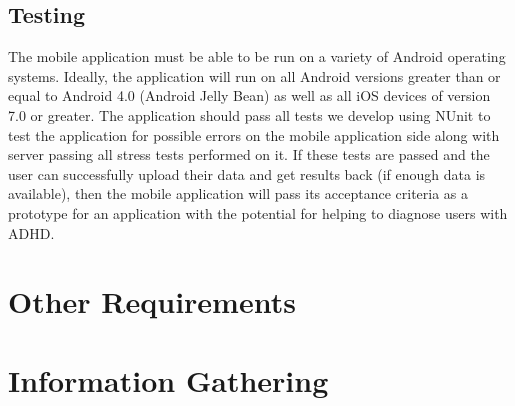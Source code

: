 \documentclass[a4wide]{article}
\begin{document}
\subsection{Testing}
The mobile application must be able to be run on a variety of Android operating
systems. Ideally, the application will run on all Android versions greater than
or equal to Android 4.0 (Android Jelly Bean) as well as all iOS devices of
version 7.0 or greater. The application should pass all tests we develop using
NUnit to test the application for possible errors on the mobile application side
along with server passing all stress tests performed on it. If these tests are
passed and the user can successfully upload their data and get results back (if
enough data is available), then the mobile application will pass its acceptance
criteria as a prototype for an application with the potential for helping to
diagnose users with ADHD.




\section{Other Requirements}
\newpage
\appendix
\appendixpage

\section{Information Gathering}
\end{document}

